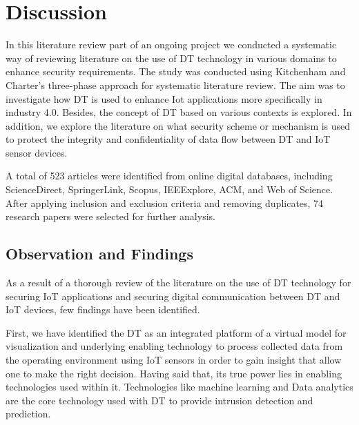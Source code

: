 \chapter{Discussion}
\label{Chapter4} %
In this literature review part of an ongoing project we conducted a systematic way of reviewing literature  on the use of DT technology in various domains to enhance security requirements. The study was conducted using Kitchenham and Charter's three-phase approach for systematic literature review. The aim was to investigate how DT is used to enhance Iot applications more specifically in industry 4.0. Besides, the concept of DT based on various contexts is explored. In addition, we explore the literature on what security scheme or mechanism is used to protect the integrity and confidentiality of data flow between DT and IoT sensor devices.

A total of 523 articles were identified from online digital databases, including ScienceDirect, SpringerLink, Scopus, IEEExplore, ACM, and Web of Science. After applying inclusion and exclusion criteria and removing duplicates, 74 research papers were selected for further analysis.

\section{Observation and Findings}
As a result of a thorough review of the literature on the use of DT technology for securing IoT applications and securing digital communication between DT and IoT devices, few findings have been identified.

First, we have identified the DT as an integrated platform of a virtual model for visualization and underlying enabling technology to process collected data from the operating environment using IoT sensors in order to gain insight that allow one to make the right decision. Having said that,  its true power lies in enabling technologies used within it. Technologies like machine learning and Data analytics are the core technology used with DT to provide intrusion detection and prediction. 

